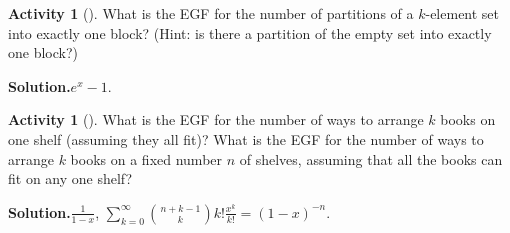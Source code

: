 \documentclass[10pt,]{book}
\theoremstyle{plain}
\theoremstyle{definition}
\newtheorem{activity}[project]{Activity}
\numberwithin{equation}{chapter}
\begin{document}
\begin{activity}[]\label{oneblockpartitions}
What is the EGF for the number of partitions of a \(k\)-element set into exactly one block? (Hint: is there a partition of the empty set into exactly one block?)%
\par\medskip\noindent%
\textbf{Solution.}\quad \(e^x-1\).%
\end{activity}
\begin{activity}[]\label{exponentialbookshelf}
What is the EGF for the number of ways to arrange \(k\) books on one shelf (assuming they all fit)? What is the EGF for the number of ways to arrange \(k\) books on a fixed number \(n\) of shelves, assuming that all the books can fit on any one shelf?%
\par\medskip\noindent%
\textbf{Solution.}\quad \(\frac{1}{ 1-x}\), \(\sum_{k=0}^\infty \binom{n+k-1 }{k}k!\frac{x^k}{k!} = (1-x)^{-n}\).%
\end{activity}
\typeout{************************************************}
\typeout{************************************************}
\end{document}
